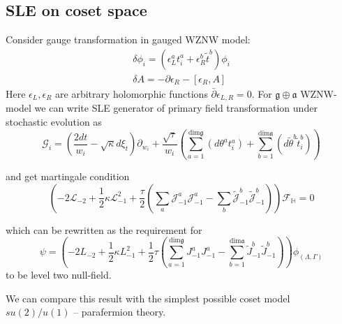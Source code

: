 \documentclass[12pt]{article}
\theoremstyle{definition}
\newcommand{\gf}{\mathfrak{g}}
\newcommand{\af}{\mathfrak{a}}
\theoremstyle{definition} \newtheorem{Def}{Definition}
\begin{document}
\subsection{SLE on coset space}
Consider gauge transformation in gauged WZNW model:
\begin{eqnarray*}
  \delta \phi_{i}=(\epsilon_{L}^{a} t^{a}_{i}+\epsilon^{b}_{R}\tilde{t}^{b})\phi_{i}\\
  \delta A = -\partial \epsilon_{R}-[\epsilon_{R},A]
\end{eqnarray*}
Here $\epsilon_{L}, \epsilon_{R}$ are arbitrary holomorphic functions $\bar\partial\epsilon_{L,R}=0$. 
For  $\gf\oplus \af$ WZNW-model we can write SLE generator of primary field transformation under stochastic evolution as
\begin{equation*}
  \mathcal{G}_{i}=\left(\frac{2dt}{w_{i}}-\sqrt{\kappa} d\xi_{t}\right) \partial_{w_{i}}+\frac{\sqrt{\tau}}{w_{i}}\left(\sum_{a=1}^{\mathrm{dim} \gf}\left(d \theta ^{a} t^{a}_{i}\right)+\sum_{b=1}^{\mathrm{dim} \af}\left(d \tilde{\theta} ^{b} \tilde{t}^{b}_{i}\right)\right)
\end{equation*}

and get martingale condition
\begin{equation*}
  \left(-2 \mathcal{L}_{-2}+\frac{1}{2}\kappa \mathcal{L}_{-1}^{2}+\frac{\tau}{2}\left( \sum_{a} \mathcal{J}^{a}_{-1} \mathcal{J}^{a}_{-1}-
      \sum_{b}\tilde{\mathcal{J}}^{b}_{-1} \tilde{\mathcal{J}}^{b}_{-1}\right)\right)        \mathcal{F}_{\mathbb{H}}=0
\end{equation*}

which can be rewritten as the requirement for
\begin{equation*}
  \psi=\left(-2L_{-2}+\frac{1}{2}\kappa L_{-1}^{2}+\frac{1}{2}\tau \left(\sum_{a=1}^{\mathrm{dim}\gf}J^{a}_{-1}J^{a}_{-1}-\sum_{b=1}^{\mathrm{dim}\af}\tilde{J}^{b}_{-1}\tilde{J}^{b}_{-1}\right)\right) \phi_{(\Lambda,\Gamma)}
\end{equation*}
to be level two null-field.

We can compare this result with the simplest possible coset model $su(2)/u(1)$ --  parafermion theory.
\end{document}
